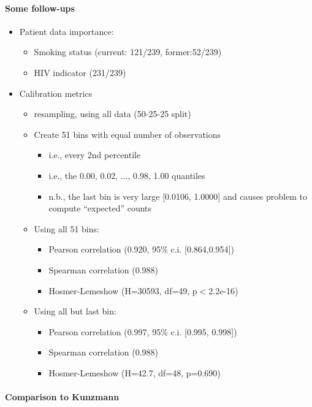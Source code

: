 \documentclass[12pt]{article}
\begin{document}
\paragraph*{Some follow-ups}
\begin{itemize}
	\item Patient data importance:
	\begin{itemize}
		\item Smoking status (current: 121/239, former:52/239)
		\item HIV indicator (231/239)
	\end{itemize}
	\item Calibration metrics
	\begin{itemize}
		\item resampling, using all data (50-25-25 split)
		\item Create 51 bins with equal number of observations
		\begin{itemize}
			\item i.e., every 2nd percentile
			\item i.e., the 0.00, 0.02, ..., 0.98, 1.00 quantiles
			\item n.b., the last bin is very large [0.0106, 1.0000] and causes problem to compute ``expected'' counts
		\end{itemize}
		\item Using all 51 bins:
		\begin{itemize}
			\item Pearson correlation (0.920, 95\% c.i. [0.864,0.954])
			\item Spearman correlation (0.988)
			\item Hosmer-Lemeshow (H=30593, df=49, p$<$2.2e-16)
		\end{itemize}
		\item Using all but last bin:
		\begin{itemize}
			\item Pearson correlation (0.997, 95\% c.i. [0.995, 0.998])
			\item Spearman correlation (0.988)
			\item Hosmer-Lemeshow (H=42.7, df=48, p=0.690)
		\end{itemize}
	\end{itemize}
\end{itemize}


\paragraph*{Comparison to Kunzmann}
\end{document}
